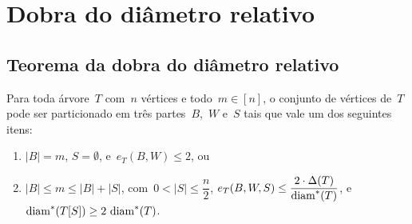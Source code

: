 \section {Dobra do diâmetro relativo}
\label{sec:dobraDiametro}
	\subsection{Teorema da dobra do diâmetro relativo}
	
		\begin{teo}
		\label{teo:dobraDiametro}
			Para toda árvore~$T$ com~$n$ vértices e 
			todo~$m\in [n]$,
			o conjunto de vértices de~$T$ pode ser particionado em 
			três partes~$B$,~$W$ e~$S$ tais que vale um dos 
			seguintes itens:
			\begin{enumerate}
				\item ${|B|=m}$, ${S=\emptyset}$, e~${e_T(B,W)\le 2}$, ou
				\item ${|B|\le m\le |B|+|S|}$, 
				com~${0<|S|\le\dfrac{n}{2}}$,
				${e_T(B,W,S)\le \dfrac{2\cdot 
				\Delta(T)}{\mathrm{diam}^*(T)}}$, 
				e~${\mathrm{diam}^*(T[S])\ge 2\ \mathrm{diam}^*(T)}$.
			\end{enumerate}
		\end{teo}

	\bigskip
	\bigskip



